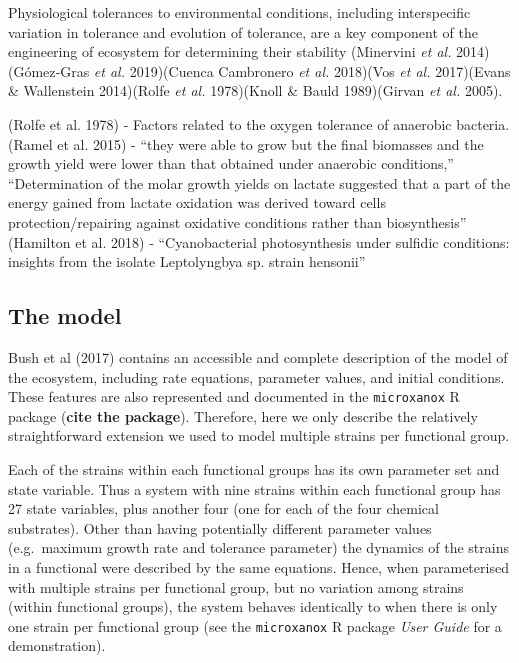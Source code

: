 \documentclass{article}
\begin{document}
Physiological tolerances to environmental conditions, including
interspecific variation in tolerance and evolution of tolerance, are a
key component of the engineering of ecosystem for determining their
stability (Minervini \emph{et al.} 2014)(Gómez‐Gras \emph{et al.}
2019)(Cuenca Cambronero \emph{et al.} 2018)(Vos \emph{et al.}
2017)(Evans \& Wallenstein 2014)(Rolfe \emph{et al.} 1978)(Knoll \&
Bauld 1989)(Girvan \emph{et al.} 2005).

(Rolfe et al. 1978) - Factors related to the oxygen tolerance of
anaerobic bacteria. (Ramel et al. 2015) - ``they were able to grow but
the final biomasses and the growth yield were lower than that obtained
under anaerobic conditions,'' ``Determination of the molar growth yields
on lactate suggested that a part of the energy gained from lactate
oxidation was derived toward cells protection/repairing against
oxidative conditions rather than biosynthesis'' (Hamilton et al. 2018) -
``Cyanobacterial photosynthesis under sulfidic conditions: insights from
the isolate Leptolyngbya sp. strain hensonii''

\hypertarget{the-model}{%
\subsection{The model}\label{the-model}}

Bush et al (2017) contains an accessible and complete description of the
model of the ecosystem, including rate equations, parameter values, and
initial conditions. These features are also represented and documented
in the \texttt{microxanox} R package (\textbf{cite the package}).
Therefore, here we only describe the relatively straightforward
extension we used to model multiple strains per functional group.

Each of the strains within each functional groups has its own parameter
set and state variable. Thus a system with nine strains within each
functional group has 27 state variables, plus another four (one for each
of the four chemical substrates). Other than having potentially
different parameter values (e.g.~maximum growth rate and tolerance
parameter) the dynamics of the strains in a functional were described by
the same equations. Hence, when parameterised with multiple strains per
functional group, but no variation among strains (within functional
groups), the system behaves identically to when there is only one strain
per functional group (see the \texttt{microxanox} R package \emph{User
Guide} for a demonstration).
\end{document}
